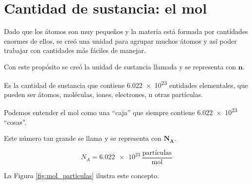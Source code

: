\section{Cantidad de sustancia: el mol}

Dado que los átomos son muy pequeños y la materia está formada por cantidades enormes de ellos, se creó una unidad para agrupar muchos átomos y así poder trabajar con cantidades más fáciles de manejar.

Con este propósito se creó la unidad de sustancia llamada  y se representa con \( \bm{n} \).

\begin{definition}[Mol]
    Es la cantidad de sustancia que contiene \num{6.022e23} entidades elementales, que pueden ser átomos, moléculas, iones, electrones, u otras partículas.
\end{definition}

Podemos entender el mol como una ``caja'' que siempre contiene \num{6.022e23} ``cosas''.

Este número tan grande se llama  y se representa con \( \bm{N_A} \).

\begin{equation*}
    N_A = \num{6.022e23}\ \dfrac{\text{partículas}}{\unit{\mol}}
\end{equation*}

La Figura \eqref{fig:mol_particulas} ilustra este concepto.


